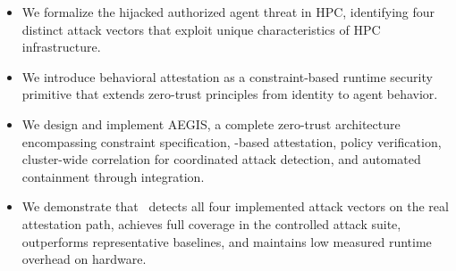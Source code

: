 \begin{itemize}
    \item We formalize the hijacked authorized agent threat in HPC, identifying four distinct attack vectors that exploit unique characteristics of HPC infrastructure.
    \item We introduce behavioral attestation as a constraint-based runtime security primitive that extends zero-trust principles from identity to agent behavior.
    \item We design and implement AEGIS, a complete zero-trust architecture encompassing constraint specification, \ebpf-based attestation, policy verification, cluster-wide correlation for coordinated attack detection, and automated containment through \slurm{} integration.
    \item We demonstrate that \projectname~detects all four implemented attack vectors on the real attestation path, achieves full coverage in the controlled attack suite, outperforms representative baselines, and maintains low measured runtime overhead on \epyc{} hardware.
\end{itemize}
